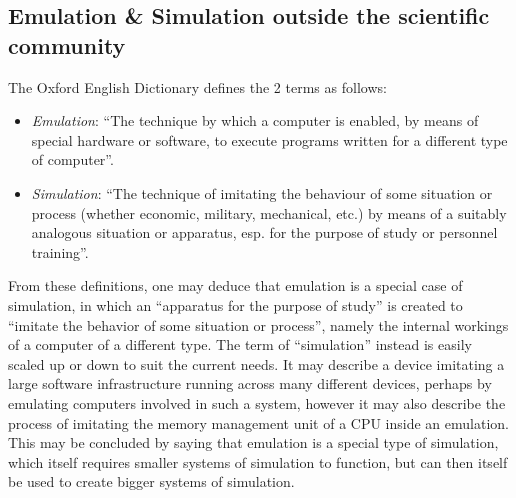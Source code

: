 \subsection{Emulation \& Simulation outside the scientific community}
The Oxford English Dictionary defines the 2 terms as follows:
\begin{itemize}
    \item \emph{Emulation}: \enquote{The technique by which a
    computer is enabled, by means of special
    hardware or software, to execute programs
    written for a different type of computer}\cite[p. 196]{emulation_oxford}.
    \item \emph{Simulation}: \enquote{The technique of imitating the behaviour of
    some situation or process (whether economic,
    military, mechanical, etc.) by means of a
    suitably analogous situation or apparatus, esp.
    for the purpose of study or personnel training}\cite[p. 503]{simulation_oxford}.
\end{itemize}
From these definitions, one may deduce that emulation is a special case of simulation,
in which an \enquote{apparatus for the purpose of study} is created to \enquote{imitate the behavior of some situation or process},
namely the internal workings of a computer of a different type.
The term of \enquote{simulation} instead is easily scaled up or down to suit the current needs.
It may describe a device imitating a large software infrastructure running across many different devices,
perhaps by emulating computers involved in such a system,
however it may also describe the process of imitating the memory management unit of a CPU inside an emulation.
This may be concluded by saying that emulation is a special type of simulation,
which itself requires smaller systems of simulation to function,
but can then itself be used to create bigger systems of simulation.

